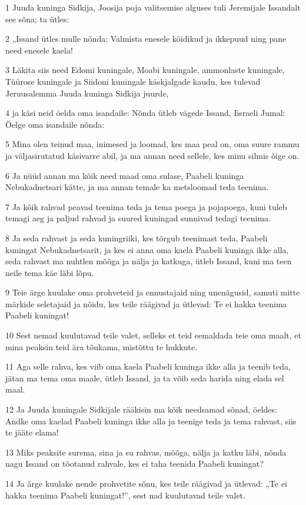 \par 1 Juuda kuninga Sidkija, Joosija poja valitsemise alguses tuli Jeremijale Issandalt see sõna; ta ütles:
\par 2 „Issand ütles mulle nõnda: Valmista enesele köidikud ja ikkepuud ning pane need enesele kaela!
\par 3 Läkita siis need Edomi kuningale, Moabi kuningale, ammonlaste kuningale, Tüürose kuningale ja Siidoni kuningale käskjalgade kaudu, kes tulevad Jeruusalemma Juuda kuninga Sidkija juurde,
\par 4 ja käsi neid öelda oma isandaile: Nõnda ütleb vägede Issand, Iisraeli Jumal: Öelge oma isandaile nõnda:
\par 5 Mina olen teinud maa, inimesed ja loomad, kes maa peal on, oma suure rammu ja väljasirutatud käsivarre abil, ja ma annan need sellele, kes minu silmis õige on.
\par 6 Ja nüüd annan ma kõik need maad oma sulase, Paabeli kuninga Nebukadnetsari kätte, ja ma annan temale ka metsloomad teda teenima.
\par 7 Ja kõik rahvad peavad teenima teda ja tema poega ja pojapoega, kuni tuleb temagi aeg ja paljud rahvad ja suured kuningad sunnivad tedagi teenima.
\par 8 Ja seda rahvast ja seda kuningriiki, kes tõrgub teenimast teda, Paabeli kuningat Nebukadnetsarit, ja kes ei anna oma kaela Paabeli kuninga ikke alla, seda rahvast ma nuhtlen mõõga ja nälja ja katkuga, ütleb Issand, kuni ma teen neile tema käe läbi lõpu.
\par 9 Teie ärge kuulake oma prohveteid ja ennustajaid ning unenägusid, samuti mitte märkide seletajaid ja nõidu, kes teile räägivad ja ütlevad: Te ei hakka teenima Paabeli kuningat!
\par 10 Sest nemad kuulutavad teile valet, selleks et teid eemaldada teie oma maalt, et mina peaksin teid ära tõukama, mistõttu te hukkute.
\par 11 Aga selle rahva, kes viib oma kaela Paabeli kuninga ikke alla ja teenib teda, jätan ma tema oma maale, ütleb Issand, ja ta võib seda harida ning elada sel maal.
\par 12 Ja Juuda kuningale Sidkijale rääkisin ma kõik needsamad sõnad, öeldes: Andke oma kaelad Paabeli kuninga ikke alla ja teenige teda ja tema rahvast, siis te jääte elama!
\par 13 Miks peaksite surema, sina ja su rahvas, mõõga, nälja ja katku läbi, nõnda nagu Issand on tõotanud rahvale, kes ei taha teenida Paabeli kuningat?
\par 14 Ja ärge kuulake nende prohvetite sõnu, kes teile räägivad ja ütlevad: „Te ei hakka teenima Paabeli kuningat!”, sest nad kuulutavad teile valet.
